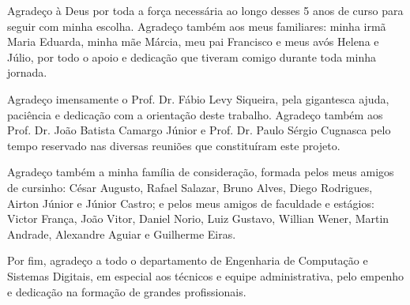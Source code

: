 \documentclass[]{politex}
\begin{document}
\capa
\falsafolhaderosto
\folhaderosto








\begin{agradecimentos}
Agradeço à Deus por toda a força necessária ao longo desses 5 anos de curso para seguir com minha escolha. Agradeço também aos meus familiares: minha irmã Maria Eduarda, minha mãe Márcia, meu pai Francisco e meus avós Helena e Júlio, por todo o apoio e dedicação que tiveram comigo durante toda minha jornada.

Agradeço imensamente o Prof. Dr. Fábio Levy Siqueira, pela gigantesca ajuda, paciência e dedicação com a orientação deste trabalho. Agradeço também aos Prof. Dr. João Batista Camargo Júnior e Prof. Dr. Paulo Sérgio Cugnasca pelo tempo reservado nas diversas reuniões que constituíram este projeto.

Agradeço também a minha família de consideração, formada pelos meus amigos de cursinho: César Augusto, Rafael Salazar, Bruno Alves, Diego Rodrigues, Airton Júnior e Júnior Castro; e pelos meus amigos de faculdade e estágios: Victor França, João Vitor, Daniel Norio, Luiz Gustavo, Willian Wener, Martin Andrade, Alexandre Aguiar e Guilherme Eiras.

Por fim, agradeço a todo o departamento de Engenharia de Computação e Sistemas Digitais, em especial aos técnicos e equipe administrativa, pelo empenho e dedicação na formação de grandes profissionais.
\end{agradecimentos}


\end{document}
